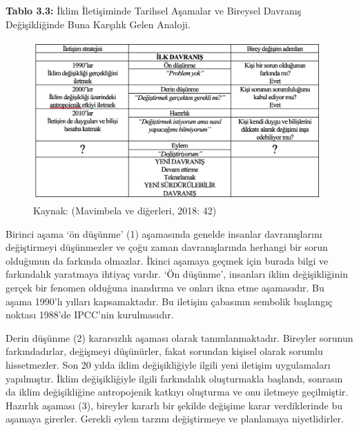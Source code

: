 \documentclass[
]{book}
\begin{document}
\textbf{Tablo 3.3:} İklim İletişiminde Tarihsel Aşamalar ve Bireysel Davranış Değişikliğinde Buna Karşılık Gelen Analoji.

\begin{figure}
\includegraphics[width=0.95\linewidth,height=0.95\textheight]{tablolar-sekiller/tablo-3-3} \caption{Kaynak: (Mavimbela ve diğerleri, 2018: 42)}\label{fig:unnamed-chunk-5}
\end{figure}

Birinci aşama `ön düşünme' (1) aşamasında genelde insanlar davranışlarını değiştirmeyi düşünmezler ve çoğu zaman davranışlarında herhangi bir sorun olduğunun da farkında olmazlar. İkinci aşamaya geçmek için burada bilgi ve farkındalık yaratmaya ihtiyaç vardır. `Ön düşünme', insanları iklim değişikliğinin gerçek bir fenomen olduğuna inandırma ve onları ikna etme aşamasıdır. Bu aşama 1990'lı yılları kapsamaktadır. Bu iletişim çabasının sembolik başlangıç noktası 1988'de IPCC'nin kurulmasıdır.

Derin düşünme (2) kararsızlık aşaması olarak tanımlanmaktadır. Bireyler sorunun farkındadırlar, değişmeyi düşünürler, fakat sorundan kişisel olarak sorumlu hissetmezler. Son 20 yılda iklim değişikliğiyle ilgili yeni iletişim uygulamaları yapılmıştır. İklim değişikliğiyle ilgili farkındalık oluşturmakla başlandı, sonrasın da iklim değişikliğine antropojenik katkıyı oluşturma ve onu iletmeye geçilmiştir.
Hazırlık aşaması (3), bireyler kararlı bir şekilde değişime karar verdiklerinde bu aşamaya girerler. Gerekli eylem tarzını değiştirmeye ve planlamaya niyetlidirler.
\end{document}
